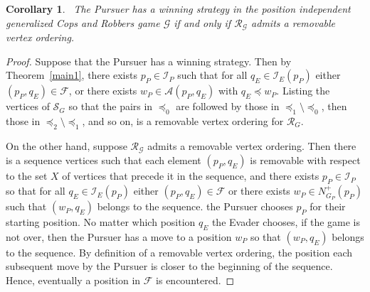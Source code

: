 \documentclass[12pt,reqno]{amsart}
\newtheorem{corollary}[theorem]{Corollary}
\begin{document}
\smallskip
\begin{corollary}~\label{ordering}
The Pursuer has a winning strategy in the position independent generalized Cops and Robbers game $\mathcal{G}$ if and only if $\mathcal{R}_{\mathcal{G}}$ admits a removable vertex ordering.
\end{corollary}
\begin{proof}
 Suppose that the Pursuer has a winning strategy.  Then by Theorem~\ref{main1}, there exists $p_P \in \mathcal{I}_P$ such that for all $q_E \in \mathcal{I}_E(p_P)$ either $(p_P, q_E) \in \mathcal{F}$,
or there exists $w_P \in \mathcal{A}(p_P, q_E)$ with $q_E \preceq w_P$.  Listing the vertices of $\mathcal{S}_G$ so that the pairs in $\preceq_0$ are followed by those in $\preceq_1 \setminus
\preceq_0$, then those in $\preceq_2 \setminus \preceq_1$, and so on, is a removable vertex ordering for $\mathcal{R}_G$.

On the other hand, suppose $\mathcal{R}_{\mathcal{G}}$ admits a removable vertex ordering.  Then there is a sequence vertices such that each element $(p_P, q_E)$ is removable with respect to the set
$X$ of vertices that precede it in the sequence, and there exists $p_P \in \mathcal{I}_P$ so that  for all $q_E \in \mathcal{I}_E(p_P)$ either $(p_P, q_E) \in \mathcal{F}$ or there exists $w_P \in
N^+_{G_P}(p_P)$ such that $(w_P, q_E)$ belongs to the sequence.  the Pursuer chooses $p_P$ for their starting position.  No matter which position $q_E$ the Evader chooses, if the game is not over,
then the Pursuer has a move to a position $w_P$ so that $(w_P, q_E)$ belongs to the sequence.  By definition of a removable vertex ordering, the position each subsequent move by the Pursuer is closer
to the beginning of the sequence.  Hence, eventually a position in $\mathcal{F}$ is encountered.
\end{proof}
\end{document}
